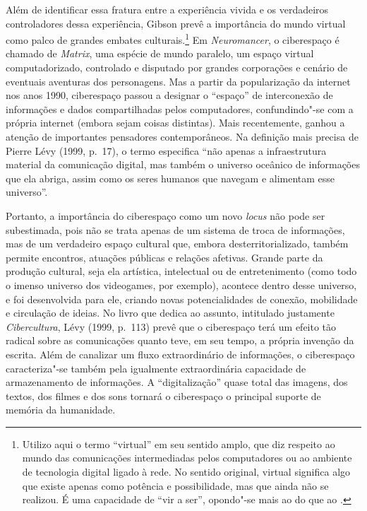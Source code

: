 Além de identificar essa fratura entre a experiência vivida e os
verdadeiros controladores dessa experiência, Gibson prevê a importância
do mundo virtual como palco de grandes embates culturais.\footnote{Utilizo aqui o termo ``virtual'' em seu sentido amplo, que diz respeito ao mundo das comunicações intermediadas pelos computadores ou ao ambiente de tecnologia digital ligado à rede. No sentido original, virtual significa algo que existe apenas como potência e possibilidade, mas que ainda não se realizou. É uma capacidade de ``vir a ser'', opondo"-se mais ao {} do que ao {}.} Em \emph{Neuromancer}, o
ciberespaço é chamado de \emph{Matrix}, uma espécie de mundo paralelo,
um espaço virtual computadorizado, controlado e disputado por grandes
corporações e cenário de eventuais aventuras dos personagens. Mas a
partir da popularização da internet nos anos 1990, ciberespaço passou a
designar o ``espaço'' de interconexão de informações e dados
compartilhadas pelos computadores, confundindo"-se com a própria internet
(embora sejam coisas distintas). Mais recentemente, ganhou a atenção de
importantes pensadores contemporâneos. Na definição mais precisa de
Pierre Lévy (1999, p.~17), o termo especifica ``não apenas a
infraestrutura material da comunicação digital, mas também o universo
oceânico de informações que ela abriga, assim como os seres humanos que
navegam e alimentam esse universo''.

Portanto, a importância do ciberespaço como um novo \emph{locus} não pode ser
subestimada, pois não se trata apenas de um sistema de troca de
informações, mas de um verdadeiro espaço cultural que, embora desterritorializado,
também permite encontros, atuações públicas e relações afetivas.
Grande parte da produção cultural, seja ela artística,
intelectual ou de entretenimento (como todo o imenso universo dos
videogames, por exemplo), acontece dentro desse universo, e foi
desenvolvida para ele, criando novas potencialidades de conexão,
mobilidade e circulação de ideias. No livro que dedica ao assunto,
intitulado justamente \emph{Cibercultura}, Lévy (1999, p.~113) prevê que
o ciberespaço terá um efeito tão radical sobre as comunicações quanto
teve, em seu tempo, a própria invenção da escrita. Além de canalizar um
fluxo extraordinário de informações, o ciberespaço caracteriza"-se também
pela igualmente extraordinária capacidade de armazenamento de
informações. A ``digitalização'' quase total das imagens, dos textos,
dos filmes e dos sons tornará o ciberespaço o principal suporte de
memória da humanidade.


